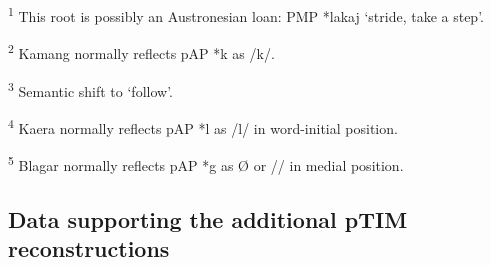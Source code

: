 {\raggedright
 
\textsuperscript{1} This root is possibly an Austronesian loan: PMP *lakaj `stride, take a step'.  

\textsuperscript{2} Kamang normally reflects pAP *k as /k/.  

\textsuperscript{3} Semantic shift to `follow'. 

\textsuperscript{4} Kaera normally reflects pAP *l as /l/ in word-initial position.

\textsuperscript{5} Blagar normally reflects pAP *g as {\O} or /{\textglotstop}/ in medial position.
}
\newpage
\subsection{Data supporting the additional pTIM reconstructions}
\label{sec:3:app:2}
 
